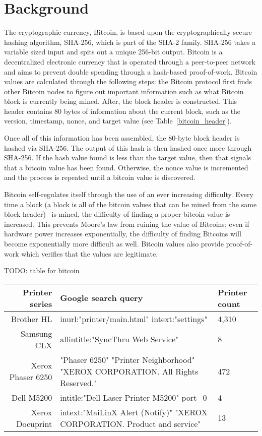 \section{Background}

The cryptographic currency, Bitcoin, is based upon the cryptographically secure hashing algorithm, SHA-256, which is part of the SHA-2 family.
SHA-256 takes a variable sized input and spits out a unique 256-bit output.
Bitcoin is a decentralized electronic currency that is operated through a peer-to-peer network and aims to prevent double spending through a hash-based proof-of-work.
Bitcoin values are calculated through the following steps: the Bitcoin protocol first finds other Bitcoin nodes to figure out important information such as what Bitcoin block is currently being mined.
After, the block header is constructed.
This header contains 80 bytes of information about the current block, such as the version, timestamp, nonce, and target value (see Table~\ref{bitcoin_header}).

Once all of this information has been assembled, the 80-byte block header is hashed via SHA-256.
The output of this hash is then hashed once more through SHA-256.
If the hash value found is less than the target value, then that signals that a bitcoin value has been found.
Otherwise, the nonce value is incremented and the process is repeated until a bitcoin value is discovered.

Bitcoin self-regulates itself through the use of an ever increasing difficulty.
Every time a block (a block is all of the bitcoin values that can be mined from the same block header)  is mined, the difficulty of finding a proper bitcoin value is increased.
This prevents Moore’s law from ruining the value of Bitcoins; even if hardware power increases exponentially, the difficulty of finding Bitcoins will become exponentially more difficult as well.
Bitcoin values also provide proof-of-work which verifies that the values are legitimate.

\begin{table}
\label{bitcoin_header}
TODO: table for bitcoin
\end{table}


\begin{table}
\label{printer_dorks}
\begin{tabular}{r| l | l}
    \hline
    \hline
    {\bf Printer series} & {\bf Google search query} & {\bf Printer count} \\
    \hline
    Brother HL & inurl:"printer/main.html" intext:"settings" & 4,310 \\
    Samsung CLX & allintitle:"SyncThru Web Service" & 8 \\
    Xerox Phaser 6250 & "Phaser 6250" "Printer Neighborhood" "XEROX CORPORATION. All Rights Reserved." & 472 \\
           Dell M5200 & intitle:"Dell Laser Printer M5200" port_0 & 4 \\
      Xerox Docuprint & intext:"MaiLinX Alert (Notify)" "XEROX CORPORATION. Product and service" & 13 \\
    \hline
\end{tabular}
\end{table}
